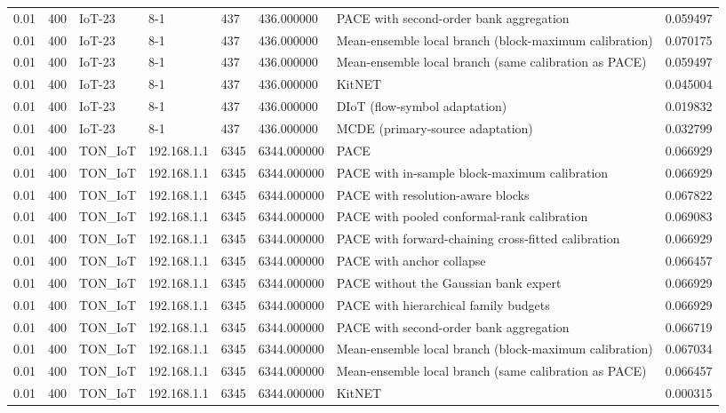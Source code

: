 \begin{tabular}{llllllll}
0.01 & 400 & IoT-23 & 8-1 & 437 & 436.000000 & PACE with second-order bank aggregation & 0.059497 \\
0.01 & 400 & IoT-23 & 8-1 & 437 & 436.000000 & Mean-ensemble local branch (block-maximum calibration) & 0.070175 \\
0.01 & 400 & IoT-23 & 8-1 & 437 & 436.000000 & Mean-ensemble local branch (same calibration as PACE) & 0.059497 \\
0.01 & 400 & IoT-23 & 8-1 & 437 & 436.000000 & KitNET & 0.045004 \\
0.01 & 400 & IoT-23 & 8-1 & 437 & 436.000000 & DIoT (flow-symbol adaptation) & 0.019832 \\
0.01 & 400 & IoT-23 & 8-1 & 437 & 436.000000 & MCDE (primary-source adaptation) & 0.032799 \\
0.01 & 400 & TON\_IoT & 192.168.1.1 & 6345 & 6344.000000 & PACE & 0.066929 \\
0.01 & 400 & TON\_IoT & 192.168.1.1 & 6345 & 6344.000000 & PACE with in-sample block-maximum calibration & 0.066929 \\
0.01 & 400 & TON\_IoT & 192.168.1.1 & 6345 & 6344.000000 & PACE with resolution-aware blocks & 0.067822 \\
0.01 & 400 & TON\_IoT & 192.168.1.1 & 6345 & 6344.000000 & PACE with pooled conformal-rank calibration & 0.069083 \\
0.01 & 400 & TON\_IoT & 192.168.1.1 & 6345 & 6344.000000 & PACE with forward-chaining cross-fitted calibration & 0.066929 \\
0.01 & 400 & TON\_IoT & 192.168.1.1 & 6345 & 6344.000000 & PACE with anchor collapse & 0.066457 \\
0.01 & 400 & TON\_IoT & 192.168.1.1 & 6345 & 6344.000000 & PACE without the Gaussian bank expert & 0.066929 \\
0.01 & 400 & TON\_IoT & 192.168.1.1 & 6345 & 6344.000000 & PACE with hierarchical family budgets & 0.066929 \\
0.01 & 400 & TON\_IoT & 192.168.1.1 & 6345 & 6344.000000 & PACE with second-order bank aggregation & 0.066719 \\
0.01 & 400 & TON\_IoT & 192.168.1.1 & 6345 & 6344.000000 & Mean-ensemble local branch (block-maximum calibration) & 0.067034 \\
0.01 & 400 & TON\_IoT & 192.168.1.1 & 6345 & 6344.000000 & Mean-ensemble local branch (same calibration as PACE) & 0.066457 \\
0.01 & 400 & TON\_IoT & 192.168.1.1 & 6345 & 6344.000000 & KitNET & 0.000315 \\

\end{tabular}
